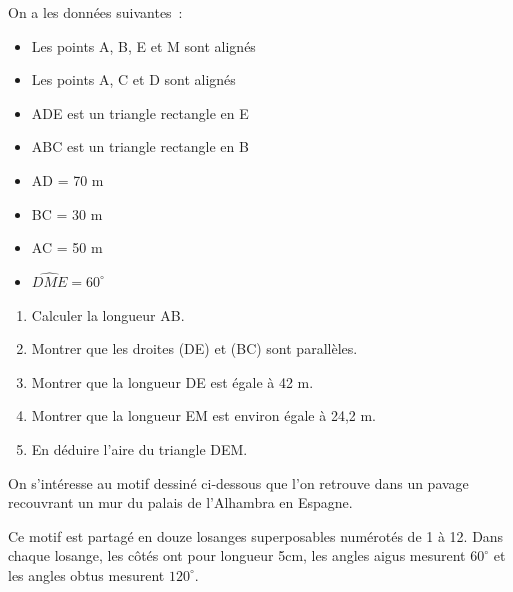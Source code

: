\documentclass{article}
\makeatletter
\def\@identity#1{#1}
\let\mathspoint\@identity
\makeatother
\begin{document}
    \noindent On a les données suivantes~:
    \begin{itemize}
        \item Les points \mathspoint{A}, \mathspoint{B}, \mathspoint{E} et
        \mathspoint{M}  sont alignés
        \item Les points \mathspoint{A}, \mathspoint{C} et \mathspoint{D} sont
        alignés
        \item \mathspoint{ADE} est un triangle rectangle en \mathspoint{E}
        \item \mathspoint{ABC} est un triangle rectangle en \mathspoint{B}
        \item \mathspoint{AD} = 70 m
        \item \mathspoint{BC} = 30 m
        \item \mathspoint{AC} = 50 m
        \item $\widehat{\mathspoint{DME}}=60^\circ$
    \end{itemize}
    \begin{enumerate}
        \item Calculer la longueur \mathspoint{AB}.
        \item Montrer que les droites \mathspoint{(DE)} et \mathspoint{(BC)}
        sont parallèles.
        \item Montrer que la longueur \mathspoint{DE} est égale à 42 m.
        \item Montrer que la longueur \mathspoint{EM} est environ égale à 24,2 m.
        \item En déduire l'aire du triangle \mathspoint{DEM}.
    \end{enumerate}
\newpage
    On s'intéresse au motif dessiné ci-dessous que l'on retrouve dans un pavage
    recouvrant un mur du palais de l'Alhambra en Espagne.\par\noindent
    Ce motif est partagé en douze losanges superposables numérotés de 1 à 12. Dans
    chaque losange, les côtés ont pour longueur 5cm, les angles aigus mesurent
    $60^\circ$ et les angles obtus mesurent $120^\circ$.
\end{document}
